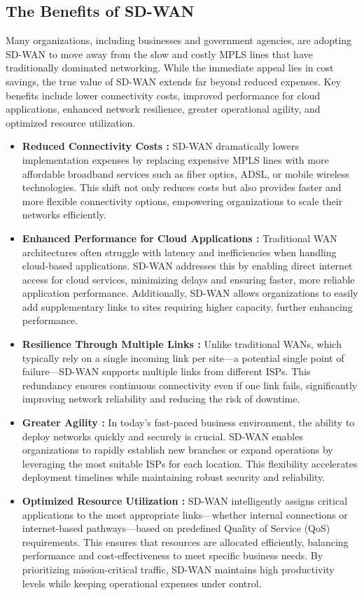\documentclass[12pt,english]{report}
\begin{document}
\subsection{The Benefits of SD-WAN}
Many organizations, including businesses and government agencies, are adopting SD-WAN to move away from the slow and costly MPLS lines that have traditionally dominated networking. While the immediate appeal lies in cost savings, the true value of SD-WAN extends far beyond reduced expenses. Key benefits include lower connectivity costs, improved performance for cloud applications, enhanced network resilience, greater operational agility, and optimized resource utilization.
    \begin{itemize}

 \item \textbf{Reduced Connectivity Costs :} SD-WAN dramatically lowers implementation expenses by replacing expensive MPLS lines with more affordable broadband services such as fiber optics, ADSL, or mobile wireless technologies. This shift not only reduces costs but also provides faster and more flexible connectivity options, empowering organizations to scale their networks efficiently.

 \item \textbf{Enhanced Performance for Cloud Applications :} Traditional WAN architectures often struggle with latency and inefficiencies when handling cloud-based applications. SD-WAN addresses this by enabling direct internet access for cloud services, minimizing delays and ensuring faster, more reliable application performance. Additionally, SD-WAN allows organizations to easily add supplementary links to sites requiring higher capacity, further enhancing performance.

 \item \textbf{Resilience Through Multiple Links :} Unlike traditional WANs, which typically rely on a single incoming link per site—a potential single point of failure—SD-WAN supports multiple links from different ISPs. This redundancy ensures continuous connectivity even if one link fails, significantly improving network reliability and reducing the risk of downtime.

 \item \textbf{Greater Agility :} In today’s fast-paced business environment, the ability to deploy networks quickly and securely is crucial. SD-WAN enables organizations to rapidly establish new branches or expand operations by leveraging the most suitable ISPs for each location. This flexibility accelerates deployment timelines while maintaining robust security and reliability.

 \item \textbf{Optimized Resource Utilization :} SD-WAN intelligently assigns critical applications to the most appropriate links—whether internal connections or internet-based pathways—based on predefined Quality of Service (QoS) requirements. This ensures that resources are allocated efficiently, balancing performance and cost-effectiveness to meet specific business needs. By prioritizing mission-critical traffic, SD-WAN maintains high productivity levels while keeping operational expenses under control\cite{ref3}.
\end{itemize}
\end{document}
